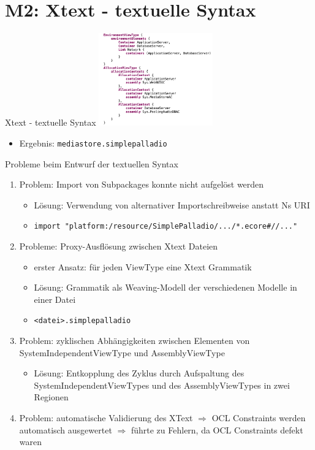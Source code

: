 \section[M2: Xtext]{M2: Xtext - textuelle Syntax}
\begin{frame}{Xtext - textuelle Syntax}
    \centering
    \includegraphics[height=40mm]{figures/xtext.png}
    \begin{itemize}
        \item Ergebnis: \texttt{mediastore.simplepalladio}
    \end{itemize}
\end{frame}

\begin{frame}{Probleme beim Entwurf der textuellen Syntax}
	\begin{enumerate}
		\item Problem: Import von Subpackages konnte nicht aufgelöst werden
		\begin{itemize}
            \item Lösung: Verwendung von alternativer Importschreibweise anstatt Ns URI
            \item \texttt{import "platform:/resource/SimplePalladio/.../*.ecore\#//..."}
        \end{itemize}
        \item Probleme: Proxy-Ausflösung zwischen Xtext Dateien
		\begin{itemize}
            \item erster Ansatz: für jeden ViewType eine Xtext Grammatik
            \item Lösung: Grammatik als Weaving-Modell der verschiedenen Modelle in einer Datei
            \item \texttt{<datei>.simplepalladio}
        \end{itemize}
        \item Problem: zyklischen Abhängigkeiten zwischen Elementen von SystemIndependentViewType und AssemblyViewType
        \begin{itemize}
            \item Lösung: Entkopplung des Zyklus durch Aufspaltung des SystemIndependentViewTypes und des AssemblyViewTypes in zwei Regionen
        \end{itemize}
        \item Problem: automatische Validierung des XText $\Rightarrow$ OCL Constraints werden automatisch ausgewertet $\Rightarrow$ führte zu Fehlern, da OCL Constraints defekt waren
	\end{enumerate}
\end{frame}